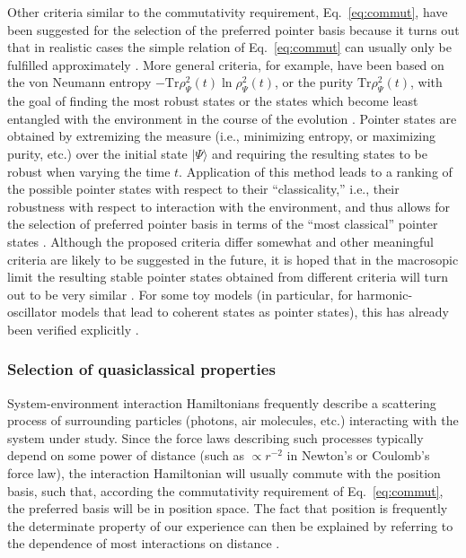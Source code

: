 \documentclass[twocolumn,rmp,aps,amsmath,amsfonts,noshowkeys,noshowpacs]{revtex4}
\newcommand{\ket}[1]{\ensuremath{|{#1\rangle}}}
\begin{document}
Other criteria similar to the commutativity requirement,
Eq.~\eqref{eq:commut}, have been suggested for the selection of the
preferred pointer basis because it turns out that in realistic cases
the simple relation of Eq.~\eqref{eq:commut} can usually only be
fulfilled approximately \citep{Zurek:1993:qq,Zurek:1993:pu}. More
general criteria, for example, have been based on the von Neumann
entropy $-\text{Tr} \rho^2_\Psi(t) \ln \rho^2_\Psi(t)$, or the purity
$\text{Tr}\rho^2_\Psi(t)$, with the goal of finding the most robust
states or the states which become least entangled with the environment
in the course of the evolution
\citep{Zurek:1993:qq,Zurek:1993:pu,Zurek:1998:re,Zurek:2002:ii}.
Pointer states are obtained by extremizing the measure (i.e.,
minimizing entropy, or maximizing purity, etc.) over the initial state
$\ket{\Psi}$ and requiring the resulting states to be robust when
varying the time $t$.  Application of this method leads to a ranking
of the possible pointer states with respect to their ``classicality,''
i.e., their robustness with respect to interaction with the
environment, and thus allows for the selection of preferred pointer
basis in terms of the ``most classical'' pointer states \citep[the
``predictability sieve''; see][]{Zurek:1993:pu,Zurek:1993:qq}.
Although the proposed criteria differ somewhat and other meaningful
criteria are likely to be suggested in the future, it is hoped that in
the macrosopic limit the resulting stable pointer states obtained from
different criteria will turn out to be very similar
\citep{Zurek:2002:ii}. For some toy models (in particular, for
harmonic-oscillator models that lead to coherent states as pointer
states), this has already been verified explicitly \citep[see, for
example,][]{Kubler:1973:ux,Zurek:1993:pu,Diosi:2000:yn,Joos:2003:jh,Eisert:2003:ib}.


\subsubsection{Selection of quasiclassical properties}

System-environment interaction Hamiltonians frequently describe a
scattering process of surrounding particles (photons, air molecules,
etc.) interacting with the system under study. Since the force laws
describing such processes typically depend on some power of distance
(such as $\propto r^{-2}$ in Newton's or Coulomb's force law), the
interaction Hamiltonian will usually commute with the position basis,
such that, according the commutativity requirement of
Eq.~\eqref{eq:commut}, the preferred basis will be in position space.
The fact that position is frequently the determinate property of our
experience can then be explained by referring to the dependence of
most interactions on distance
\citep{Zurek:1981:dd,Zurek:1982:tv,Zurek:1991:vv}.
\end{document}
